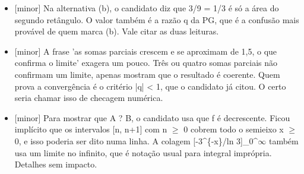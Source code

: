 \documentclass{article}%
\begin{document}
\begin{itemize}%
\item%
{[}minor{]} Na alternativa (b), o candidato diz que 3/9 = 1/3 é só a área do segundo retângulo. O valor também é a razão q da PG, que é a confusão mais provável de quem marca (b). Vale citar as duas leituras.%
\item%
{[}minor{]} A frase 'as somas parciais crescem e se aproximam de 1,5, o que confirma o limite' exagera um pouco. Três ou quatro somas parciais não confirmam um limite, apenas mostram que o resultado é coerente. Quem prova a convergência é o critério |q| < 1, que o candidato já citou. O certo seria chamar isso de checagem numérica.%
\item%
{[}minor{]} Para mostrar que A ? B, o candidato usa que f é decrescente. Ficou implícito que os intervalos {[}n, n+1{]} com n $\geq$ 0 cobrem todo o semieixo x $\geq$ 0, e isso poderia ser dito numa linha. A colagem {[}{-}3\^{}\{{-}x\}/ln 3{]}\_0\^{}$\infty$ também usa um limite no infinito, que é notação usual para integral imprópria. Detalhes sem impacto.%
\end{itemize}%
\end{document}
